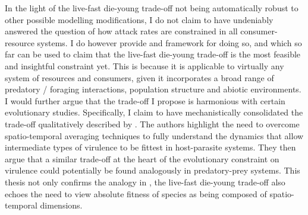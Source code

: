 \documentclass[a4paper]{report}
\begin{document}
  In the light of the live-fast die-young trade-off not being automatically robust to other possible modelling modifications, I do not claim to have undeniably answered the question of how attack rates are constrained in all consumer-resource systems. I do however provide and framework for doing so, and which so far can be used to claim that the live-fast die-young trade-off is the most feasible and insightful constraint yet. This is because it is applicable to virtually any system of resources and consumers, given it incorporates a broad range of predatory / foraging interactions, population structure and abiotic environments. I would further argue that the trade-off I propose is harmonious with certain evolutionary studies. Specifically, I claim to have mechanistically consolidated the trade-off qualitatively described by \citep{Goodnight2008}. The authors highlight the need to overcome spatio-temporal averaging techniques to fully understand the dynamics that allow intermediate types of virulence to be fittest in host-parasite systems. They then argue that a similar trade-off at the heart of the evolutionary constraint on virulence could potentially be found analogously in predatory-prey systems. This thesis not only confirms the analogy in \citep{Goodnight2008}, the live-fast die-young trade-off also echoes the need to view absolute fitness of species as being composed of spatio-temporal dimensions. \\
  
\end{document}
